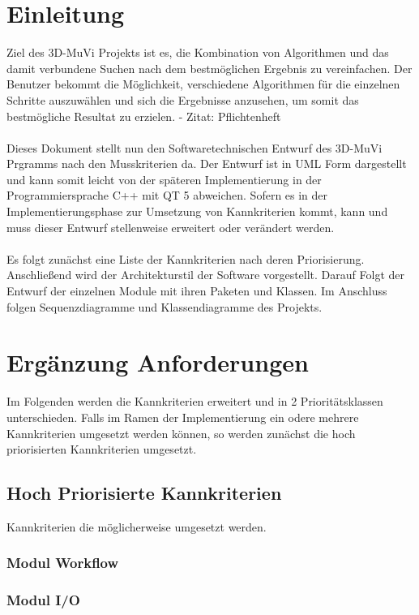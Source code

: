 \section{Einleitung}

Ziel des 3D-MuVi Projekts ist es, die Kombination von Algorithmen und das damit
verbundene Suchen nach dem bestmöglichen Ergebnis zu vereinfachen. 
Der Benutzer bekommt die Möglichkeit, verschiedene Algorithmen für die einzelnen Schritte auszuwählen
und sich die Ergebnisse anzusehen, um somit das bestmögliche Resultat zu erzielen.  \linebreak 
 - Zitat: Pflichtenheft
\\\\
Dieses Dokument stellt nun den Softwaretechnischen Entwurf des 3D-MuVi Prgramms nach den Musskriterien da.
Der Entwurf ist in UML Form dargestellt und kann somit leicht von der späteren Implementierung in der Programmiersprache C++ mit QT 5 abweichen. 
Sofern es in der Implementierungsphase zur Umsetzung von Kannkriterien kommt, kann und muss dieser Entwurf stellenweise erweitert oder verändert werden.
\\\\
Es folgt zunächst eine Liste der Kannkriterien nach deren Priorisierung. 
Anschließend wird der Architekturstil der Software vorgestellt.
Darauf Folgt der Entwurf der einzelnen Module mit ihren Paketen und Klassen.
Im Anschluss folgen Sequenzdiagramme und Klassendiagramme des Projekts.


\section{Ergänzung Anforderungen}
Im Folgenden werden die Kannkriterien erweitert und in 2 Prioritätsklassen unterschieden.
Falls im Ramen der Implementierung ein odere mehrere Kannkriterien umgesetzt werden können, so werden zunächst die hoch priorisierten Kannkriterien umgesetzt.
\subsection{Hoch Priorisierte Kannkriterien}
Kannkriterien die möglicherweise umgesetzt werden.
\subsubsection{Modul Workflow}
\subsubsection{Modul I/O}
